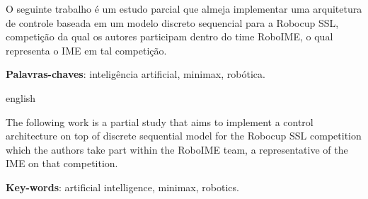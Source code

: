\setlength{\absparsep}{18pt} %
\begin{resumo}


  O seguinte trabalho é um estudo parcial que almeja implementar uma arquitetura
  de controle baseada em um modelo discreto sequencial para a Robocup SSL,
  competição da qual os autores participam dentro do time RoboIME, o qual
  representa o IME em tal competição.

  \textbf{Palavras-chaves}: inteligência artificial, minimax, robótica.
\end{resumo}

\begin{resumo}[Abstract]
  \begin{otherlanguage*}{english}


    The following work is a partial study that aims to implement a control
    architecture on top of discrete sequential model for the Robocup SSL
    competition which the authors take part within the RoboIME team, a
    representative of the IME on that competition.

    \textbf{Key-words}: artificial intelligence, minimax, robotics.
  \end{otherlanguage*}
\end{resumo}

